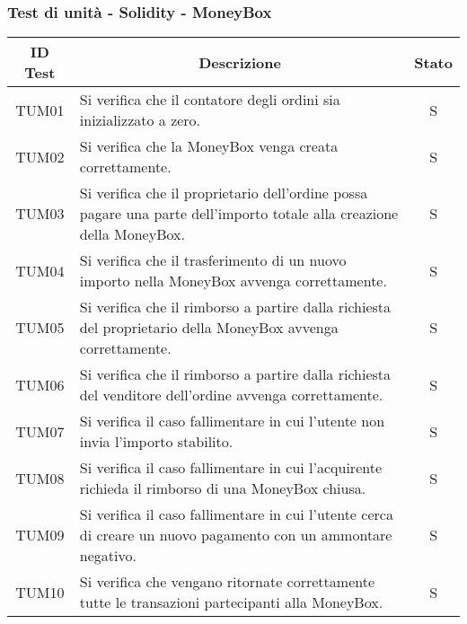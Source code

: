 \subsubsection{Test di unità - Solidity - MoneyBox} \label{subsubsection:TUM}
\begin{table}[H]
  \centering
  \renewcommand{\arraystretch}{1.8}
  \begin{tabular}{c|p{10cm}|c}
    \rowcolor[HTML]{125E28}
    \color[HTML]{FFFFFF}\textbf{ID Test}
          & \multicolumn{1}{c}{\color[HTML]{FFFFFF}\textbf{Descrizione}}
          & \color[HTML]{FFFFFF}\textbf{Stato}                                                                                                 \\
    \hline
    TUM01 & Si verifica che il contatore degli ordini sia inizializzato a zero.                                                            & S \\
    TUM02 & Si verifica che la MoneyBox\glo{} venga creata correttamente.                                                                  & S \\
    TUM03 & Si verifica che il proprietario dell'ordine possa pagare una parte dell'importo totale alla creazione della MoneyBox\glo{}.    & S \\
    TUM04 & Si verifica che il trasferimento di un nuovo importo nella MoneyBox\glo{} avvenga correttamente.                               & S \\
    TUM05 & Si verifica che il rimborso a partire dalla richiesta del proprietario della MoneyBox\glo{} avvenga correttamente.             & S \\
    TUM06 & Si verifica che il rimborso a partire dalla richiesta del venditore dell'ordine avvenga correttamente.                         & S \\
    TUM07 & Si verifica il caso fallimentare in cui l'utente non invia l'importo stabilito.                                                & S \\
    TUM08 & Si verifica il caso fallimentare in cui l'acquirente richieda il rimborso di una MoneyBox\glo{} chiusa.                        & S \\
    TUM09 & Si verifica il caso fallimentare in cui l'utente cerca di creare un nuovo pagamento con un ammontare negativo.                 & S \\
    TUM10 & Si verifica che vengano ritornate correttamente tutte le transazioni partecipanti alla MoneyBox\glo{}.                         & S \\

\end{tabular}
\end{table}
